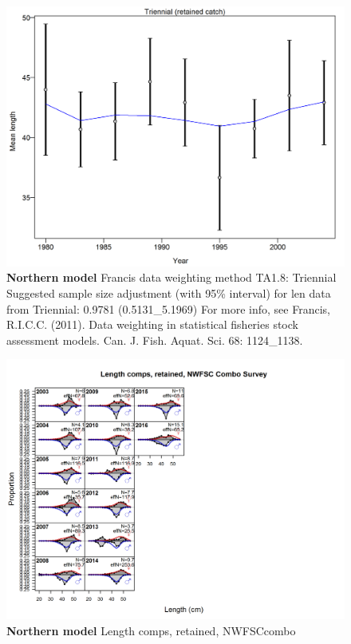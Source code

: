 \documentclass[12pt,]{article}
\begin{document}
\begin{figure}[htbp]
\centering
\includegraphics{./r4ss/plots_mod1/comp_lenfit_data_weighting_TA1.8_Triennial.png}
\caption{\textbf{Northern model} Francis data weighting method TA1.8:
Triennial Suggested sample size adjustment (with 95\% interval) for len
data from Triennial: 0.9781 (0.5131\_5.1969) For more info, see Francis,
R.I.C.C. (2011). Data weighting in statistical fisheries stock
assessment models. Can. J. Fish. Aquat. Sci. 68: 1124\_1138.
\label{fig:mod1_25_comp_lenfit_data_weighting_TA1.8_Triennial}}
\end{figure}

\begin{figure}[htbp]
\centering
\includegraphics{./r4ss/plots_mod1/comp_lenfit_flt6mkt2.png}
\caption{\textbf{Northern model} Length comps, retained, NWFSCcombo
\label{fig:mod1_26_comp_lenfit_flt6mkt2}}
\end{figure}
\end{document}
